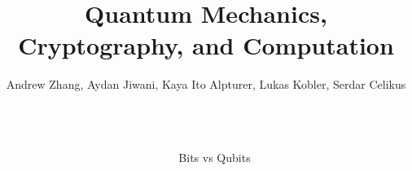 \documentclass[final, 20pt]{beamer}
\title{Quantum Mechanics, Cryptography, and Computation} %
\author{Andrew Zhang, Aydan Jiwani, Kaya Ito Alpturer, Lukas Kobler, Serdar Celikus} %
\institute{ISSYP 2018 - Perimeter Institute for Theoretical Physics} %
\newlength{\sepwid}
\newlength{\onecolwid}
\begin{document}

\setlength{\belowcaptionskip}{2ex} %
\setlength\belowdisplayshortskip{2ex} %

\begin{frame}[t] %

\begin{columns}[t] %

\begin{column}{\sepwid}\end{column} %

\begin{column}{\onecolwid} %


\begin{block}{Bits vs Qubits}


\end{block}
\end{column}
\end{columns}
\end{frame}
\end{document}
